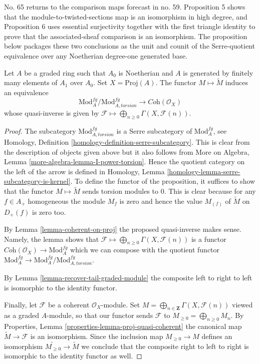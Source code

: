 \begin{proposition}
\begin{history}
No. 65 returns to the comparison maps forecast in no. 59. Proposition 5
shows that the module-to-twisted-sections map is an isomorphism in high
degree, and Proposition 6 uses essential surjectivity together with the
first triangle identity to prove that the associated-sheaf comparison is an
isomorphism. The proposition below packages these two conclusions as the
unit and counit of the Serre-quotient equivalence over any Noetherian
degree-one generated base.
\end{history}
Let $A$ be a graded ring such that $A_0$ is Noetherian and $A$ is generated
by finitely many elements of $A_1$ over $A_0$.
Set $X = \text{Proj}(A)$. The functor $M \mapsto \widetilde M$
induces an equivalence
$$
\text{Mod}^{fg}_A/\text{Mod}^{fg}_{A, torsion}
\longrightarrow
\textit{Coh}(\mathcal{O}_X)
$$
whose quasi-inverse is given by
$\mathcal{F} \longmapsto \bigoplus_{n \geq 0} \Gamma(X, \mathcal{F}(n))$.
\end{proposition}

\begin{proof}
The subcategory $\text{Mod}^{fg}_{A, torsion}$ is a Serre subcategory
of $\text{Mod}^{fg}_A$, see
Homology, Definition \ref{homology-definition-serre-subcategory}.
This is clear from the description of objects given above but it also follows
from More on Algebra, Lemma \ref{more-algebra-lemma-I-power-torsion}.
Hence the quotient category on the left of the arrow is defined
in Homology, Lemma \ref{homology-lemma-serre-subcategory-is-kernel}.
To define the functor of the proposition, it suffices to show that
the functor $M \mapsto \widetilde M$ sends torsion modules to $0$.
This is clear because for any $f \in A_+$ homogeneous the
module $M_f$ is zero and hence the value $M_{(f)}$ of $\widetilde M$
on $D_+(f)$ is zero too.

\medskip\noindent
By Lemma \ref{lemma-coherent-on-proj} the proposed quasi-inverse
makes sense. Namely, the lemma shows that
$\mathcal{F} \longmapsto \bigoplus_{n \geq 0} \Gamma(X, \mathcal{F}(n))$
is a functor $\textit{Coh}(\mathcal{O}_X) \to \text{Mod}^{fg}_A$
which we can compose with the quotient functor
$\text{Mod}^{fg}_A \to \text{Mod}^{fg}_A/\text{Mod}^{fg}_{A, torsion}$.

\medskip\noindent
By Lemma \ref{lemma-recover-tail-graded-module}
the composite left to right to left is isomorphic to the identity functor.

\medskip\noindent
Finally, let $\mathcal{F}$ be a coherent $\mathcal{O}_X$-module.
Set $M = \bigoplus_{n \in \mathbf{Z}} \Gamma(X, \mathcal{F}(n))$
viewed as a graded $A$-module, so that our functor sends $\mathcal{F}$ to
$M_{\geq 0} = \bigoplus_{n \geq 0} M_n$.
By Properties, Lemma \ref{properties-lemma-proj-quasi-coherent}
the canonical map $\widetilde M \to \mathcal{F}$
is an isomorphism. Since the inclusion map
$M_{\geq 0} \to M$ defines an isomorphism
$\widetilde{M_{\geq 0}} \to \widetilde M$ we conclude that
the composite right to left to right is isomorphic to the identity
functor as well.
\end{proof}

